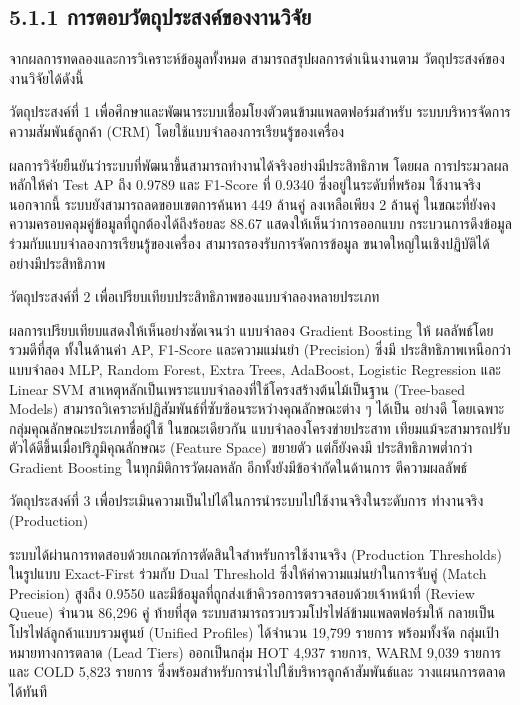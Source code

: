 \documentclass[12pt,a4paper]{report}
\begin{document}
\subsection*{5.1.1 การตอบวัตถุประสงค์ของงานวิจัย}
จากผลการทดลองและการวิเคราะห์ข้อมูลทั้งหมด สามารถสรุปผลการดำเนินงานตาม วัตถุประสงค์ของงานวิจัยได้ดังนี้\par
วัตถุประสงค์ที่ 1 เพื่อศึกษาและพัฒนาระบบเชื่อมโยงตัวตนข้ามแพลตฟอร์มสำหรับ ระบบบริหารจัดการความสัมพันธ์ลูกค้า (CRM) โดยใช้แบบจำลองการเรียนรู้ของเครื่อง\par
ผลการวิจัยยืนยันว่าระบบที่พัฒนาขึ้นสามารถทำงานได้จริงอย่างมีประสิทธิภาพ โดยผล การประมวลผลหลักให้ค่า Test AP ถึง 0.9789 และ F1-Score ที่ 0.9340 ซึ่งอยู่ในระดับที่พร้อม ใช้งานจริง นอกจากนี้ ระบบยังสามารถลดขอบเขตการค้นหา 449 ล้านคู่ ลงเหลือเพียง 2 ล้านคู่ ในขณะที่ยังคงความครอบคลุมคู่ข้อมูลที่ถูกต้องได้ถึงร้อยละ 88.67 แสดงให้เห็นว่าการออกแบบ กระบวนการดึงข้อมูล ร่วมกับแบบจำลองการเรียนรู้ของเครื่อง สามารถรองรับการจัดการข้อมูล ขนาดใหญ่ในเชิงปฏิบัติได้อย่างมีประสิทธิภาพ\par
วัตถุประสงค์ที่ 2 เพื่อเปรียบเทียบประสิทธิภาพของแบบจำลองหลายประเภท\par
\clearpage
ผลการเปรียบเทียบแสดงให้เห็นอย่างชัดเจนว่า แบบจำลอง Gradient Boosting ให้ ผลลัพธ์โดยรวมดีที่สุด ทั้งในด้านค่า AP, F1-Score และความแม่นยำ (Precision) ซึ่งมี ประสิทธิภาพเหนือกว่าแบบจำลอง MLP, Random Forest, Extra Trees, AdaBoost, Logistic Regression และ Linear SVM สาเหตุหลักเป็นเพราะแบบจำลองที่ใช้โครงสร้างต้นไม้เป็นฐาน (Tree-based Models) สามารถวิเคราะห์ปฏิสัมพันธ์ที่ซับซ้อนระหว่างคุณลักษณะต่าง ๆ ได้เป็น อย่างดี โดยเฉพาะกลุ่มคุณลักษณะประเภทชื่อผู้ใช้ ในขณะเดียวกัน แบบจำลองโครงข่ายประสาท เทียมแม้จะสามารถปรับตัวได้ดีขึ้นเมื่อปริภูมิคุณลักษณะ (Feature Space) ขยายตัว แต่ก็ยังคงมี ประสิทธิภาพต่ำกว่า Gradient Boosting ในทุกมิติการวัดผลหลัก อีกทั้งยังมีข้อจำกัดในด้านการ ตีความผลลัพธ์\par
วัตถุประสงค์ที่ 3 เพื่อประเมินความเป็นไปได้ในการนำระบบไปใช้งานจริงในระดับการ ทำงานจริง (Production)\par
ระบบได้ผ่านการทดสอบด้วยเกณฑ์การตัดสินใจสำหรับการใช้งานจริง (Production Thresholds) ในรูปแบบ Exact-First ร่วมกับ Dual Threshold ซึ่งให้ค่าความแม่นยำในการจับคู่ (Match Precision) สูงถึง 0.9550 และมีข้อมูลที่ถูกส่งเข้าคิวรอการตรวจสอบด้วยเจ้าหน้าที่ (Review Queue) จำนวน 86,296 คู่ ท้ายที่สุด ระบบสามารถรวบรวมโปรไฟล์ข้ามแพลตฟอร์มให้ กลายเป็นโปรไฟล์ลูกค้าแบบรวมศูนย์ (Unified Profiles) ได้จำนวน 19,799 รายการ พร้อมทั้งจัด กลุ่มเป้าหมายทางการตลาด (Lead Tiers) ออกเป็นกลุ่ม HOT 4,937 รายการ, WARM 9,039 รายการ และ COLD 5,823 รายการ ซึ่งพร้อมสำหรับการนำไปใช้บริหารลูกค้าสัมพันธ์และ วางแผนการตลาดได้ทันที\par
\end{document}

